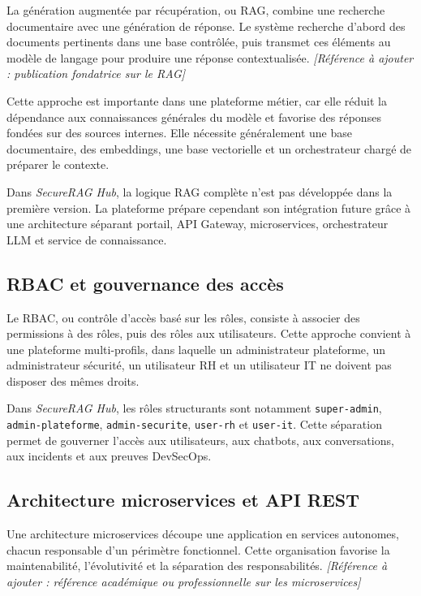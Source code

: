 La génération augmentée par récupération, ou RAG, combine une recherche documentaire avec une génération de réponse. Le système recherche d'abord des documents pertinents dans une base contrôlée, puis transmet ces éléments au modèle de langage pour produire une réponse contextualisée. \textit{[Référence à ajouter : publication fondatrice sur le RAG]}

Cette approche est importante dans une plateforme métier, car elle réduit la dépendance aux connaissances générales du modèle et favorise des réponses fondées sur des sources internes. Elle nécessite généralement une base documentaire, des embeddings, une base vectorielle et un orchestrateur chargé de préparer le contexte.

Dans \textit{SecureRAG Hub}, la logique RAG complète n'est pas développée dans la première version. La plateforme prépare cependant son intégration future grâce à une architecture séparant portail, API Gateway, microservices, orchestrateur LLM et service de connaissance.

\subsection{RBAC et gouvernance des accès}

Le RBAC, ou contrôle d'accès basé sur les rôles, consiste à associer des permissions à des rôles, puis des rôles aux utilisateurs. Cette approche convient à une plateforme multi-profils, dans laquelle un administrateur plateforme, un administrateur sécurité, un utilisateur RH et un utilisateur IT ne doivent pas disposer des mêmes droits.

Dans \textit{SecureRAG Hub}, les rôles structurants sont notamment \texttt{super-admin}, \texttt{admin-plateforme}, \texttt{admin-securite}, \texttt{user-rh} et \texttt{user-it}. Cette séparation permet de gouverner l'accès aux utilisateurs, aux chatbots, aux conversations, aux incidents et aux preuves DevSecOps.

\subsection{Architecture microservices et API REST}

Une architecture microservices découpe une application en services autonomes, chacun responsable d'un périmètre fonctionnel. Cette organisation favorise la maintenabilité, l'évolutivité et la séparation des responsabilités. \textit{[Référence à ajouter : référence académique ou professionnelle sur les microservices]}

